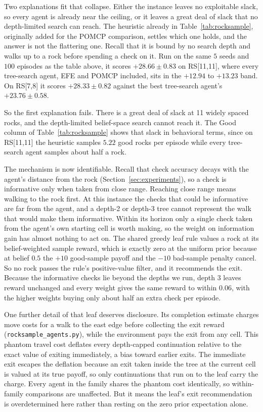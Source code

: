 Two explanations fit that collapse. Either the instance leaves no exploitable slack, so every agent is already near the ceiling, or it leaves a great deal of slack that no depth-limited search can reach. The heuristic already in Table~\ref{tab:rocksample}, originally added for the POMCP comparison, settles which one holds, and the answer is not the flattering one. Recall that it is bound by no search depth and walks up to a rock before spending a check on it. Run on the same $5$ seeds and $100$ episodes as the table above, it scores $+28.66 \pm 0.83$ on RS[11,11], where every tree-search agent, EFE and POMCP included, sits in the $+12.94$ to $+13.23$ band. On RS[7,8] it scores $+28.33 \pm 0.82$ against the best tree-search agent's $+23.76 \pm 0.58$.

So the first explanation fails. There is a great deal of slack at 11 widely spaced rocks, and the depth-limited belief-space search cannot reach it. The Good column of Table~\ref{tab:rocksample} shows that slack in behavioral terms, since on RS[11,11] the heuristic samples $5.22$ good rocks per episode while every tree-search agent samples about half a rock.

The mechanism is now identifiable. Recall that check accuracy decays with the agent's distance from the rock (Section~\ref{sec:experiments}), so a check is informative only when taken from close range. Reaching close range means walking to the rock first. At this instance the checks that could be informative are far from the agent, and a depth-2 or depth-3 tree cannot represent the walk that would make them informative. Within its horizon only a single check taken from the agent's own starting cell is worth making, so the weight on information gain has almost nothing to act on. The shared greedy leaf rule values a rock at its belief-weighted sample reward, which is exactly zero at the uniform prior because at belief $0.5$ the $+10$ good-sample payoff and the $-10$ bad-sample penalty cancel. So no rock passes the rule's positive-value filter, and it recommends the exit. Because the informative checks lie beyond the depths we run, depth 3 leaves reward unchanged and every weight gives the same reward to within $0.06$, with the higher weights buying only about half an extra check per episode.

One further detail of that leaf deserves disclosure. Its completion estimate charges move costs for a walk to the east edge before collecting the exit reward (\texttt{rocksample\_\allowbreak agents.py}), while the environment pays the exit from any cell. This phantom travel cost deflates every depth-capped continuation relative to the exact value of exiting immediately, a bias toward earlier exits. The immediate exit escapes the deflation because an exit taken inside the tree at the current cell is valued at its true payoff, so only continuations that run on to the leaf carry the charge. Every agent in the family shares the phantom cost identically, so within-family comparisons are unaffected. But it means the leaf's exit recommendation is overdetermined here rather than resting on the zero prior expectation alone.

